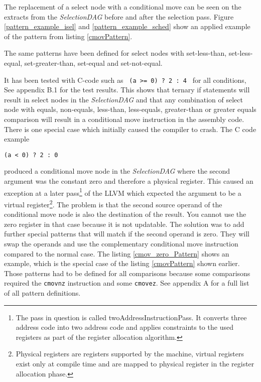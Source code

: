 \documentclass[12pt,twoside,notitlepage]{report}
\begin{document}
The replacement of a select node with a conditional move can be seen on the extracts from the \textit{SelectionDAG} before and after the selection pass. Figure \ref{pattern_example_isel} and \ref{pattern_example_sched} show an applied example of the pattern from listing \ref{cmovPattern}.

The same patterns have been defined for select nodes with set-less-than, set-less-equal, set-greater-than, set-equal and set-not-equal.

It has been tested with C-code such as \texttt{ (a >= 0) ? 2 : 4 } for all conditions, See appendix B.1 for the test results. This shows that ternary if statements will result in select nodes in the \textit{SelectionDAG} and that any combination of select node with equals, non-equals, less-than, less-equals, greater-than or greater equals comparison will result in a conditional move instruction in the assembly code.\\

There is one special case which initially caused the compiler to crash. The C code example
\begin{verbatim}
(a < 0) ? 2 : 0
\end{verbatim}
produced a conditional move node in the \textit{SelectionDAG} where the second argument was the constant zero and therefore a physical register. This caused an exception at a later pass\footnote{The pass in question is called twoAddressInstructionPass. It converts three address code into two address code and applies constraints to the used registers as part of the register allocation algorithm.} of the LLVM which expected the argument to be a virtual register\footnote{Physical registers are registers supported by the machine, virtual registers exist only at compile time and are mapped to physical register in the register allocation phase.}. The problem is that the second source operand of the conditional move node is also the destination of the result. You cannot use the zero register in that case because it is not updatable. The solution was to add further special patterns that will match if the second operand is zero. They will swap the operands and use the complementary conditional move instruction compared to the normal case. The listing \ref{cmov_zero_Pattern} shows an example, which is the special case of the listing \ref{cmovPattern} shown earlier. Those patterns had to be defined for all comparisons because some comparisons required the \texttt{cmovnz} instruction and some \texttt{cmovez}. See appendix A for a full list of all pattern definitions.
\end{document}
